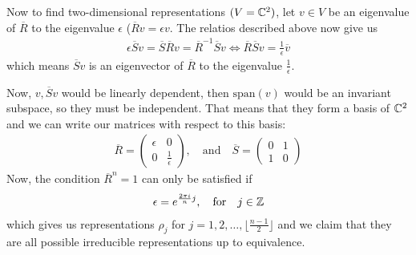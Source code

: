 Now to find two-dimensional representations $(V = \mathbb{C}^{2})$, let $v \in V$ be an eigenvalue of $\overline{R}$ to the eigenvalue $\epsilon$ ($\overline{R}v = \epsilon v$.
The relatios described above now give us
\begin{align*}
  \epsilon \overline{S}v = \overline{S}\overline{R} v = \overline{R}^{-1}\overline{S}v \iff \overline{R}\overline{S}v = \frac{1}{\epsilon} \overline{v}
\end{align*}
which means $\overline{S}v$ is an eigenvector of $\overline{R}$ to the eigenvalue $\tfrac{1}{\epsilon}$.

Now, $v, \overline{S}v$ would be linearly dependent, then $\text{span}(v)$ would be an invariant subspace, so they must be independent.
That means that they form a basis of $\mathbb{C}^{2}$ and we can write our matrices with respect to this basis:
\begin{align*}
  \overline{R} = \begin{pmatrix}
  \epsilon & 0\\
  0 & \tfrac{1}{\epsilon}
  \end{pmatrix},
  \quad \text{and} \quad \overline{S} = \begin{pmatrix}
  0 & 1\\
  1 & 0
  \end{pmatrix}
\end{align*}
Now, the condition $\overline{R}^{n} = 1$ can only be satisfied if
\begin{align*}
  \epsilon = e^{\frac{2 \pi i}{n}j}, \quad \text{for} \quad j \in \mathbb{Z}
\end{align*}
which gives us representations $\rho_j$ for $j = 1,2, \ldots, \lfloor \tfrac{n-1}{2}\rfloor$ and we claim that they are all possible irreducible representations up to equivalence.

